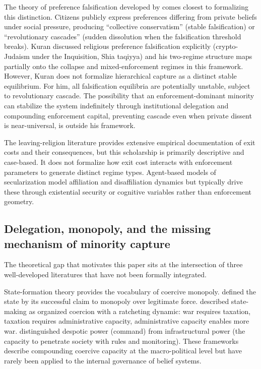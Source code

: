 \documentclass[12pt]{article}
\begin{document}
The theory of preference falsification developed by \citet{kuran1995} comes closest to formalizing this distinction. Citizens publicly express preferences differing from private beliefs under social pressure, producing ``collective conservatism'' (stable falsification) or ``revolutionary cascades'' (sudden dissolution when the falsification threshold breaks). Kuran discussed religious preference falsification explicitly (crypto-Judaism under the Inquisition, Shia taqiyya) and his two-regime structure maps partially onto the collapse and mixed-enforcement regimes in this framework. However, Kuran does not formalize hierarchical capture as a distinct stable equilibrium. For him, all falsification equilibria are potentially unstable, subject to revolutionary cascade. The possibility that an enforcement-dominant minority can stabilize the system indefinitely through institutional delegation and compounding enforcement capital, preventing cascade even when private dissent is near-universal, is outside his framework.

The leaving-religion literature \citep{bromley1998,cragun2011,streib2009} provides extensive empirical documentation of exit costs and their consequences, but this scholarship is primarily descriptive and case-based. It does not formalize how exit cost interacts with enforcement parameters to generate distinct regime types. Agent-based models of secularization \citep{gelfand2011,norenzayan2013} model affiliation and disaffiliation dynamics but typically drive these through existential security or cognitive variables rather than enforcement geometry.

\subsection{Delegation, monopoly, and the missing mechanism of minority capture}

The theoretical gap that motivates this paper sits at the intersection of three well-developed literatures that have not been formally integrated.

State-formation theory provides the vocabulary of coercive monopoly. \citet{weber1946} defined the state by its successful claim to monopoly over legitimate force. \citet{tilly1985} described state-making as organized coercion with a ratcheting dynamic: war requires taxation, taxation requires administrative capacity, administrative capacity enables more war. \citet{mann1986} distinguished despotic power (command) from infrastructural power (the capacity to penetrate society with rules and monitoring). These frameworks describe compounding coercive capacity at the macro-political level but have rarely been applied to the internal governance of belief systems.
\end{document}
